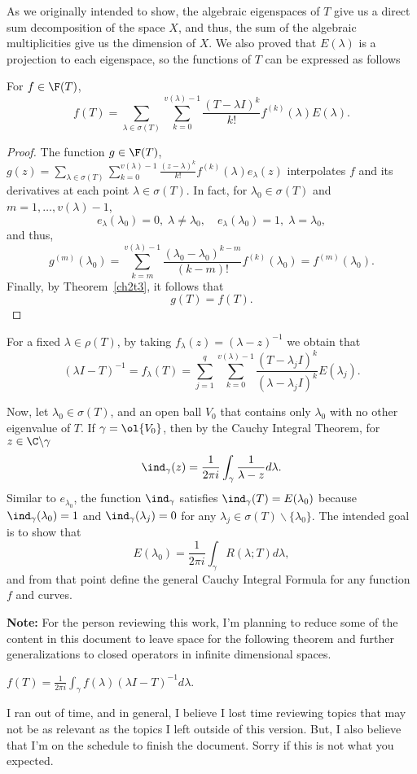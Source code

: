 As we originally intended to show, the algebraic eigenspaces of $T$ give us a direct sum decomposition of the space $X$, and thus, the sum of the algebraic multiplicities give us the dimension of $X$. We also proved that $E(\lambda)$ is a projection to each eigenspace, so the functions of $T$ can be expressed as follows

\begin{theorem}
    For $f \in \F(T)$,
    \[ f(T) = \sum_{\lambda \in \sigma(T)} \sum_{k = 0}^{v(\lambda)-1} \frac{(T-\lambda I)^k}{k!} f^{(k)}(\lambda) E(\lambda). \]
\end{theorem}

\begin{proof}
    The function $g \in \F(T)$, $g(z) = \sum_{\lambda \in \sigma(T)} \sum_{k = 0}^{v(\lambda)-1} \frac{(z-\lambda)^k}{k!} f^{(k)}(\lambda) e_\lambda(z)$ interpolates $f$ and its derivatives at each point $\lambda \in \sigma(T)$. In fact, for $\lambda_0 \in \sigma(T)$ and $m = 1,\ldots, v(\lambda) - 1$, 
    \[ e_\lambda(\lambda_0) = 0,\; \lambda \neq \lambda_0,\quad e_\lambda(\lambda_0) = 1,\; \lambda = \lambda_0,  \]
    and thus,
    \[ g^{(m)}(\lambda_0) = \sum_{k = m}^{v(\lambda)-1} \frac{(\lambda_0-\lambda_0)^{k-m}}{(k-m)!} f^{(k)}(\lambda_0) = f^{(m)}(\lambda_0).\]
    Finally, by Theorem~\ref{ch2t3}, it follows that
    \[ g(T) = f(T). \]
\end{proof}

For a fixed $\lambda \in \rho(T)$, by taking $f_\lambda(z) = (\lambda - z)^{-1}$ we obtain that
\[ (\lambda I - T)^{-1} = f_\lambda(T) = \sum_{j = 1}^{q} \sum_{k = 0}^{v(\lambda)-1} \frac{(T-\lambda_j I)^k }{(\lambda -\lambda_j I)^k} E(\lambda_j). \]

Now, let $\lambda_0 \in \sigma(T)$, and an open ball $V_0$ that contains only $\lambda_0$ with no other eigenvalue of $T$. If $\gamma = \ol{V_0}$, then by the Cauchy Integral Theorem, for $z \in \C \backslash \gamma$
\[ \ind_\gamma(z) = \frac{1}{2\pi i}\int_\gamma \frac{1}{\lambda - z} d\lambda. \]
Similar to $e_{\lambda_0}$, the function $\ind_\gamma$ satisfies $\ind_\gamma(T) = E(\lambda_0)$ because $\ind_\gamma(\lambda_0) = 1$ and $\ind_\gamma(\lambda_j) = 0$ for any $\lambda_j \in \sigma(T)\backslash\{\lambda_0\}$. The intended goal is to show that
\[ E(\lambda_0) = \frac{1}{2\pi i}\int_\gamma R(\lambda; T) d\lambda, \]
and from that point define the general Cauchy Integral Formula for any function $f$ and  curves. 

\textbf{Note:} For the person reviewing this work, I'm planning to reduce some of the content in this document to leave space for the following theorem and further generalizations to closed operators in infinite dimensional spaces.

\begin{theorem}
    $f(T) = \frac{1}{2\pi i} \int_{\gamma} f(\lambda) (\lambda I - T)^{-1} d\lambda$.
\end{theorem}

I ran out of time, and in general, I believe I lost time reviewing topics that may not be as relevant as the topics I left outside of this version. But, I also believe that I'm on the schedule to finish the document. Sorry if this is not what you expected.
